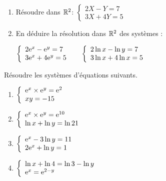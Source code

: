   
  \begin{exercice}


\begin{enumerate}
\item Résoudre dans $ \mathbb{R}^{2} $: \;$  \left\{\begin{array}{l}2X-Y=  7\\ 3X+4Y =5 \end{array}\right.$
\item En déduire la résolution  dans $ \mathbb{R}^{2} $  des systèmes :

 $  \left\{\begin{array}{l}2\mathrm{e}^{x}-\mathrm{e}^{y}=7  \\ 3\mathrm{e}^{x}+4\mathrm{e}^{y} =5 \end{array}\right.
\hspace*{0.5cm}  \left\{\begin{array}{l}2\ln x -\ln y=7  \\ 3\ln x+4\ln x =5 \end{array}\right.$

\end{enumerate}

  \end{exercice}
  
  
   \begin{exercice}
Résoudre les systèmes d'équations suivants.

\begin{enumerate}
\item $  \left\{\begin{array}{l}\mathrm{e}^{x}\times\mathrm{e}^{y}=\mathrm{e}^{2} \\ xy =-15 \end{array}\right.$
\item $  \left\{\begin{array}{l}\mathrm{e}^{x}\times\mathrm{e}^{y}=\mathrm{e}^{10} \\ \ln x  +\ln y =\ln 21 \end{array}\right.$
\item $  \left\{\begin{array}{l}\mathrm{e}^{x}-3\ln y=11 \\ 2\mathrm{e}^{x}+\ln y =1 \end{array}\right.$
\item $  \left\{\begin{array}{l}\ln x+\ln 4=\ln 3-\ln y \\ \mathrm{e}^{x}=\mathrm{e}^{2-y}  \end{array}\right.$
\end{enumerate}

  \end{exercice}


